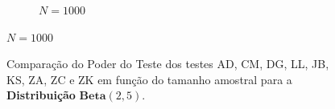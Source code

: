 \documentclass[final]{beamer}
\begin{document}
\begin{frame}[t]
\begin{columns}[t,totalwidth=0.6\paperwidth]
\begin{column}{0.45\textwidth}
\begin{figure}[H]
\begin{subfigure}[b]{0.32\textwidth}
        \centering
        \caption{\(N = 1000\)}
    \end{subfigure}
\end{figure}

\setlength\fboxrule{1pt} %
\setlength\fboxsep{2pt}  %
\begin{figure}[H]
    \centering
    \caption{Comparação do Poder do Teste dos testes AD, CM, DG, LL, JB, KS, ZA, ZC e ZK
    em função do tamanho amostral para a \textbf{Distribuição} \(\textbf{Beta}(2,5)\).}
    \label{fig:poder_teste_beta}


\end{figure}
\end{column}
\end{columns}
\end{frame}
\end{document}
